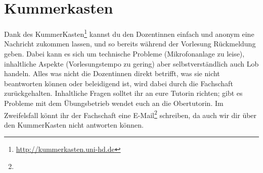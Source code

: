\section{Kummerkasten}
\label{kummerkasten}

Dank des KummerKasten\footnote{\url{http://kummerkasten.uni-hd.de}} kannst du den Dozentinnen einfach und anonym eine Nachricht zukommen lassen, und so bereits während der Vorlesung Rückmeldung geben. Dabei kann es sich um technische Probleme (Mikrofonanlage zu leise), inhaltliche Aspekte (Vorlesungstempo zu gering) aber selbstverständlich auch Lob handeln. Alles was nicht die Dozentinnen direkt betrifft, was sie nicht beantworten können oder beleidigend ist, wird dabei durch die Fachschaft zurückgehalten. Inhaltliche Fragen solltet ihr an eure Tutorin richten; gibt es Probleme mit dem Übungsbetrieb wendet euch an die Obertutorin. Im Zweifelsfall könnt ihr der Fachschaft eine E-Mail\footnote{} schreiben, da auch wir dir über den KummerKasten nicht antworten können.

